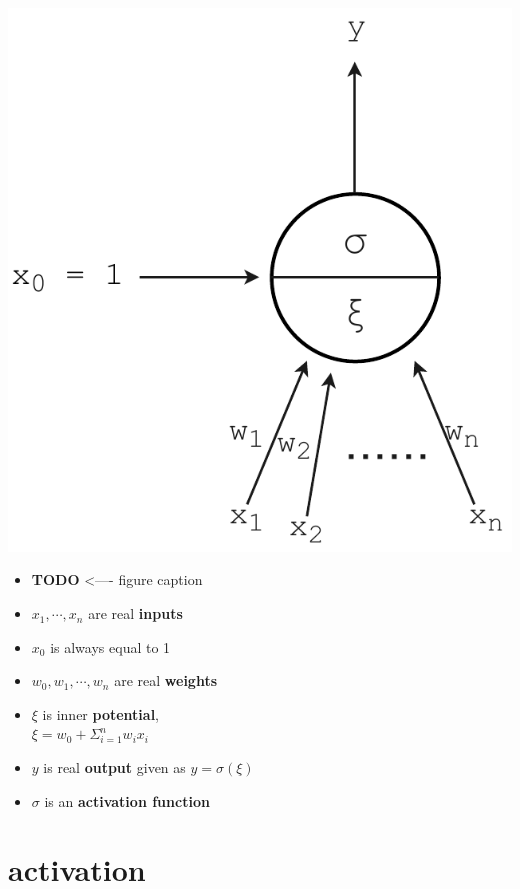 \begin{minipage}[c]{0.35\textwidth}
\includegraphics[width=\textwidth]{tex/images/perceptron}
\end{minipage}
\hfill
\begin{minipage}[c]{0.55\textwidth}


\begin{itemize}

\item \textbf{TODO} <---- figure caption 
\item $x_1, \cdots, x_n$ are real \textbf{inputs}
\item $x_0$ is always equal to 1
\item $w_0, w_1, \cdots, w_n$ are real \textbf{weights}
\item $\xi$ is inner \textbf{potential}, \\$\xi = w_0 + \Sigma_{i=1}^n w_i x_i$
\item $y$ is real \textbf{output} given as $y = \sigma(\xi)$
\item $\sigma$ is an \textbf{activation function}

\end{itemize}
\end{minipage}

\section{activation}
